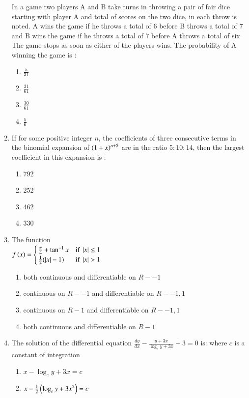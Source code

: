 \documentclass[journal]{IEEEtran}
\begin{document}
\begin{enumerate}
	In a game two players A and B take turns in throwing a pair of fair dice starting with player A and total of scores on the two dice, in each throw is noted. A wins the game if he throws a total of 6 before B throws a total of 7 and B wins the game if he throws a total of 7 before A throws a total of six The game stops as soon as either of the players wins. The probability of A winning the game is :
		\begin{enumerate}
			\item $\frac{5}{31}$
			\item $\frac{31}{61}$
			\item $\frac{30}{61}$
			\item $\frac{5}{6}$
		\end{enumerate}
	\item
	If for some positive integer $n$, the coefficients of three consecutive terms in the binomial expansion of $\left(1+x\right)^{n+5}$ are in the ratio $5:10:14$, then the largest coefficient in this expansion is :
		\begin{enumerate}
			\item 792
			\item 252
			\item 462
			\item 330
		\end{enumerate}
	\item
	The function \\
	$f\left(x\right) =
	\begin{cases}
    		\frac{\pi}{4} + \tan^{-1}{x} & \text{if } \left\vert x\right\vert \leq 1 \\
    		\frac{1}{2}(\left\vert x\right\vert-1) & \text{if } \left\vert x\right\vert > 1
	\end{cases}
	$
		\begin{enumerate}
			\item  both continuous and differentiable on $R-{-1}$
			\item continuous on $R-{-1}$ and differentiable on $R-{-1,1}$
			\item continuous on $R-{1}$ and differentiable on $R-{-1,1}$
			\item both continuous and differentiable on $R-{1}$
		\end{enumerate}
	\item 
	The solution of the differential equation $\frac{dy}{dx}-\frac{y+3x}{\log_e{y+3x}} + 3 = 0$ is: where $c$ is a constant of integration
		\begin{enumerate}
			\item $x - \log_{e}{y+3x} = c$
			\item $x - \frac{1}{2}\left({\log_{e}{y+3x}}^2\right) = c$

\end{enumerate}
\end{enumerate}
\end{document}
